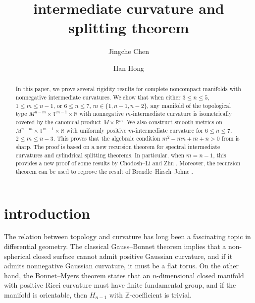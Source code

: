 \documentclass[11pt,letterpaper]{amsart}
\theoremstyle{definition}
\theoremstyle{remark}
\numberwithin{equation}{section}
\begin{document}
\title[m-intermediate curvature]{intermediate curvature and splitting theorem}

\author{Jingche Chen}
\address{Department of Mathematical Sciences, Tsinghua University, 100084, Beijing, China}



\author{Han Hong}
\address{Department of Mathematics and statistics \\ Beijing Jiaotong University \\ Beijing \\ China, 100044}





\begin{abstract}
In this paper, we prove several rigidity results for complete noncompact manifolds with nonnegative intermediate curvatures. We show that when either $3\leq n\leq 5$, $1\leq m\leq n-1$, or $6\leq n\leq 7$, $m\in \{1,n-1,n-2\}$, any manifold of the topological type $M^{n-m}\times \mathbb{T}^{m-1}\times \mathbb{R}$  with nonnegative $m$-intermediate curvature is isometrically covered by the canonical product $M\times \mathbb{R}^m$. We also construct smooth metrics on $M^{n-m}\times \mathbb{T}^{m-1}\times \mathbb{R}$ with uniformly positive $m$-intermediate curvature for $6\leq n\leq 7$, $2\leq m\leq n-3$. This proves that the algebraic condition $m^2-mn+m+n>0$ from \cite{chenshuli_end} is sharp. The proof is based on a new recursion theorem for spectral intermediate curvatures and cylindrical splitting theorems. In particular, when $m=n-1$, this provides a new proof of some results by Chodosh--Li \cite{chodoshlisoapbubble} and Zhu \cite{zhu-splitting}. Moreover, the recursion theorem can be used to reprove the result of Brendle--Hirsch--Johne \cite{brendlegeroch'sconjecture}.
\end{abstract}

\maketitle

\section{introduction}
The relation between topology and curvature has long been a fascinating topic in differential geometry. The classical Gauss--Bonnet theorem implies that a non-spherical closed surface cannot admit positive Gaussian curvature, and if it admits nonnegative Gaussian curvature, it must be a flat torus. On the other hand, the Bonnet--Myers theorem states that an $n$-dimensional closed manifold with positive Ricci curvature must have finite fundamental group, and if the manifold is orientable, then $H_{n-1}$ with $\mathbb{Z}$-coefficient is trivial.
\end{document}
